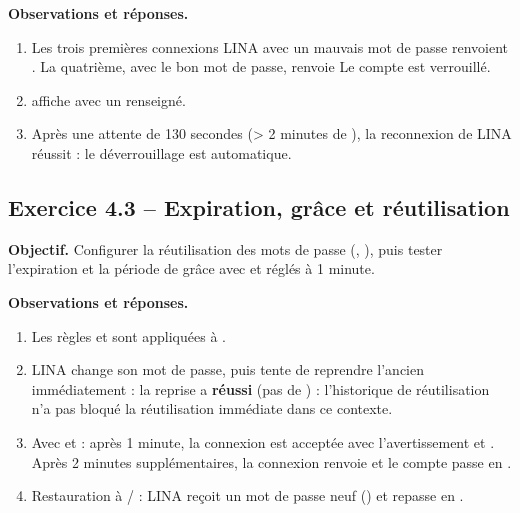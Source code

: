 
\textbf{Observations et réponses.}
\begin{enumerate}
  \item Les trois premières connexions LINA avec un mauvais mot de passe renvoient
        . La quatrième, avec le bon mot de passe, renvoie
         Le compte est verrouillé.
  \item {} affiche  avec un
         renseigné.
  \item Après une attente de 130 secondes (> 2 minutes de ),
        la reconnexion de LINA réussit : le déverrouillage est automatique.
\end{enumerate}

\subsection{Exercice 4.3 -- Expiration, grâce et réutilisation}
\textbf{Objectif.} Configurer la réutilisation des mots de passe
(, ), puis tester l'expiration
et la période de grâce avec  et 
réglés à 1 minute.


\textbf{Observations et réponses.}
\begin{enumerate}
  \item Les règles  et 
        sont appliquées à .
  \item LINA change son mot de passe, puis tente de reprendre l'ancien immédiatement :
        la reprise a \textbf{réussi} (pas de ) : l'historique de
        réutilisation n'a pas bloqué la réutilisation immédiate dans ce contexte.
  \item Avec  et  : après 1 minute, la connexion est acceptée avec l'avertissement
         et . Après 2 minutes
        supplémentaires, la connexion renvoie  et le compte passe en
        .
  \item Restauration à  /  :
        LINA reçoit un mot de passe neuf () et repasse en .
\end{enumerate}

